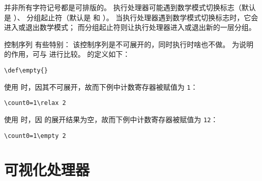 \documentclass{book}
\begin{document}
并非所有字符记号都是可排版的。
执行处理器可能遇到数学模式切换标志（默认是 ）、
分组起止符（默认是  和 ）。
当执行处理器遇到数学模式切换标志时，它会进入或退出数学模式；
而分组起止符则让执行处理器进入或退出新的一层分组。

控制序列  有些特别：
该控制序列是不可展开的，同时执行时啥也不做。
为说明  的作用，可与  进行比较。
 的定义如下：
\begin{verbatim}
\def\empty{}
\end{verbatim}
使用  时，因其不可展开，故而下例中计数寄存器被赋值为 \texttt{1}：
\begin{verbatim}
\count0=1\relax 2
\end{verbatim}
使用  时，因  的展开结果为空，故而下例中计数寄存器被赋值为 \texttt{12}：
\begin{verbatim}
\count0=1\empty 2
\end{verbatim}

\section{可视化处理器}
\end{document}
